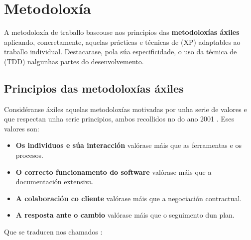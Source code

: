 \chapter[Metodoloxía]{
  \label{chp:metodoloxia}
  Metodoloxía
}
\minitoc
\newpage

A metodoloxía de traballo baseouse nos principios das \textbf{metodoloxías áxiles} aplicando, concretamente, aquelas prácticas e técnicas de \textbf{} (XP) adaptables ao traballo individual. Destacarase, pola súa especificidade, o uso da técnica de  (TDD) nalgunhas partes do desenvolvemento.

\section{Principios das metodoloxías áxiles}

Considéranse áxiles aquelas metodoloxías motivadas por unha serie de valores e que respectan unha serie principios, ambos recollidos no  do ano 2001 \cite{axiles}. Eses valores son:

\begin{itemize}
	\item \textbf{Os individuos e súa interacción} valórase máis que as ferramentas e os procesos.
	\item \textbf{O correcto funcionamento do software} valórase máis que a documentación extensiva.
	\item \textbf{A colaboración co cliente} valórase máis que a negociación contractual.
	\item \textbf{A resposta ante o cambio} valórase máis que o seguimento dun plan.
\end{itemize}

Que se traducen nos chamados \textbf{}:

